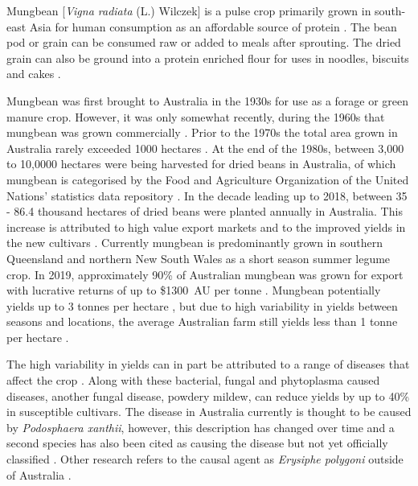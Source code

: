 \documentclass[agronomy,article,submit,moreauthors,pdftex]{mdpi}
\begin{document}

Mungbean {[}\emph{Vigna radiata} (L.) Wilczek{]} is a pulse crop primarily grown in south-east Asia for human consumption as an affordable source of protein \citep{Lambrides2007}.
The bean pod or grain can be consumed raw or added to meals after sprouting.
The dried grain can also be ground into a protein enriched flour for uses in noodles, biscuits and cakes \citep{Chankaew2013}.

Mungbean was first brought to Australia in the 1930s for use as a forage or green manure crop.
However, it was only somewhat recently, during the 1960s that mungbean was grown commercially \citep{Lawn1978, Chauhan2018}.
Prior to the 1970s the total area grown in Australia rarely exceeded 1000 hectares \citep{Lawn1978}.
At the end of the 1980s, between 3,000 to 10,0000 hectares were being harvested for dried beans in Australia, of which mungbean is categorised by the Food and Agriculture Organization of the United Nations' statistics data repository \citep{FAOSTAT}.
In the decade leading up to 2018, between 35 - 86.4 thousand hectares of dried beans were planted annually in Australia.
This increase is attributed to high value export markets and to the improved yields in the new cultivars \citep{Clarry2016}.
Currently mungbean is predominantly grown in southern Queensland and northern New South Wales as a short season summer legume crop.
In 2019, approximately 90\% of Australian mungbean was grown for export with lucrative returns of up to \$1300~AU per tonne \citep{QueenslandGovernment2019}.
Mungbean potentially yields up to 3 tonnes per hectare \citep{ThomasRobert2004}, but due to high variability in yields between seasons and locations, the average Australian farm still yields less than 1 tonne per hectare \citep{Chauhan2018}.

The high variability in yields can in part be attributed to a range of diseases that affect the crop \citep{Wood1990, Conde1991, Fuhlbohm1996, Fuhlbohm2013, Wilson2001, Noble2019}.
Along with these bacterial, fungal and phytoplasma caused diseases, another fungal disease, powdery mildew, can reduce yields by up to 40\% \citep{Chankaew2013} in susceptible cultivars.
The disease in Australia currently is thought to be caused by \emph{Podosphaera xanthii}, however, this description has changed over time and a second species has also been cited as causing the disease but not yet officially classified \citep{Kelly2019}.
Other research refers to the causal agent as \emph{Erysiphe polygoni} outside of Australia \citep{Thakur1995}.
\end{document}
